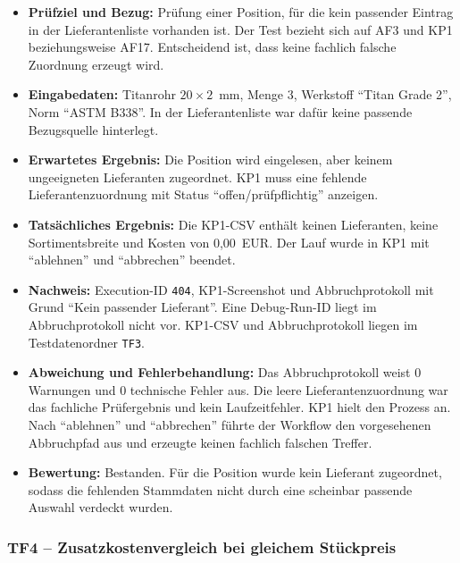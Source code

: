 \documentclass[a4paper,12pt]{article}
\begin{document}
\begin{itemize}
    \setlength{\itemsep}{3pt}
    \setlength{\parsep}{0pt}
    \item \textbf{Prüfziel und Bezug:} Prüfung einer Position, für die kein passender Eintrag in der Lieferantenliste vorhanden ist. Der Test bezieht sich auf AF3 und KP1 beziehungsweise AF17. Entscheidend ist, dass keine fachlich falsche Zuordnung erzeugt wird.
    \item \textbf{Eingabedaten:} Titanrohr \(20 \times 2\)~mm, Menge 3, Werkstoff \enquote{Titan Grade 2}, Norm \enquote{ASTM B338}. In der Lieferantenliste war dafür keine passende Bezugsquelle hinterlegt.
    \item \textbf{Erwartetes Ergebnis:} Die Position wird eingelesen, aber keinem ungeeigneten Lieferanten zugeordnet. KP1 muss eine fehlende Lieferantenzuordnung mit Status \enquote{offen/prüfpflichtig} anzeigen.
    \item \textbf{Tatsächliches Ergebnis:} Die KP1-CSV enthält keinen Lieferanten, keine Sortimentsbreite und Kosten von 0,00~EUR. Der Lauf wurde in KP1 mit \enquote{ablehnen} und \enquote{abbrechen} beendet.
    \item \textbf{Nachweis:} Execution-ID \texttt{404}, KP1-Screenshot und Abbruchprotokoll mit Grund \enquote{Kein passender Lieferant}. Eine Debug-Run-ID liegt im Abbruchprotokoll nicht vor. KP1-CSV und Abbruchprotokoll liegen im Testdatenordner \nolinkurl{TF3}.
    \item \textbf{Abweichung und Fehlerbehandlung:} Das Abbruchprotokoll weist 0 Warnungen und 0 technische Fehler aus. Die leere Lieferantenzuordnung war das fachliche Prüfergebnis und kein Laufzeitfehler. KP1 hielt den Prozess an. Nach \enquote{ablehnen} und \enquote{abbrechen} führte der Workflow den vorgesehenen Abbruchpfad aus und erzeugte keinen fachlich falschen Treffer.
    \item \textbf{Bewertung:} Bestanden. Für die Position wurde kein Lieferant zugeordnet, sodass die fehlenden Stammdaten nicht durch eine scheinbar passende Auswahl verdeckt wurden.
\end{itemize}

\subsubsection{TF4 -- Zusatzkostenvergleich bei gleichem Stückpreis}
\end{document}

